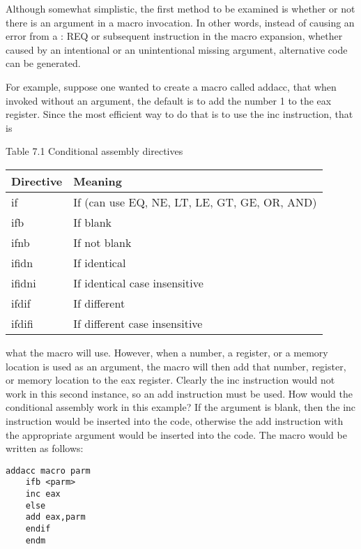 \documentclass[10pt]{article}
\begin{document}
Although somewhat simplistic, the first method to be examined is whether or not there is an argument in a macro invocation. In other words, instead of causing an error from a : REQ or subsequent instruction in the macro expansion, whether caused by an intentional or an unintentional missing argument, alternative code can be generated.

For example, suppose one wanted to create a macro called addacc, that when invoked without an argument, the default is to add the number 1 to the eax register. Since the most efficient way to do that is to use the inc instruction, that is

Table 7.1 Conditional assembly directives

\begin{center}
\begin{tabular}{ll|}
\hline
Directive & Meaning \\
\hline
if & If (can use EQ, NE, LT, LE, GT, GE, OR, AND) \\
ifb & If blank \\
ifnb & If not blank \\
ifidn & If identical \\
ifidni & If identical case insensitive \\
ifdif & If different \\
ifdifi & If different case insensitive \\
\hline
\end{tabular}
\end{center}

what the macro will use. However, when a number, a register, or a memory location is used as an argument, the macro will then add that number, register, or memory location to the eax register. Clearly the inc instruction would not work in this second instance, so an add instruction must be used. How would the conditional assembly work in this example? If the argument is blank, then the inc instruction would be inserted into the code, otherwise the add instruction with the appropriate argument would be inserted into the code. The macro would be written as follows:

\begin{verbatim}
addacc macro parm
    ifb <parm>
    inc eax
    else
    add eax,parm
    endif
    endm
\end{verbatim}
\end{document}
